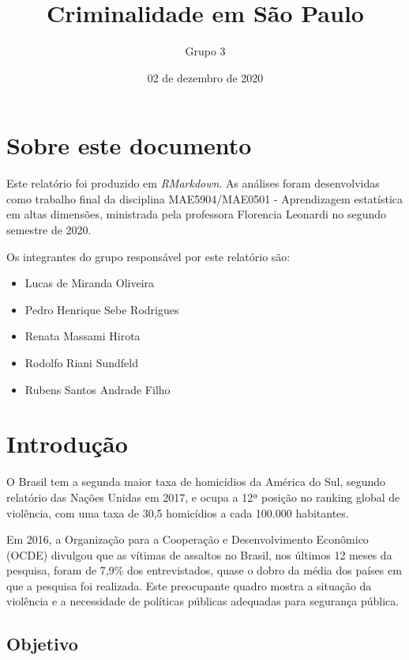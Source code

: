 \documentclass[
  12pt,
  portuguese,
]{report}
\title{Criminalidade em São Paulo}
\author{Grupo 3}
\date{02 de dezembro de 2020}
\providecommand{\tightlist}{%
  \setlength{\itemsep}{0pt}\setlength{\parskip}{0pt}}
\begin{document}
\maketitle

\listoftables
\listoffigures
\hypertarget{sobre-este-documento}{%
\chapter*{Sobre este documento}\label{sobre-este-documento}}

Este relatório foi produzido em \emph{RMarkdown}. As análises foram desenvolvidas como trabalho final da disciplina MAE5904/MAE0501 - Aprendizagem estatística em altas dimensões, ministrada pela professora Florencia Leonardi no segundo semestre de 2020.

Os integrantes do grupo responsável por este relatório são:

\begin{itemize}
\tightlist
\item
  Lucas de Miranda Oliveira
\item
  Pedro Henrique Sebe Rodrigues
\item
  Renata Massami Hirota
\item
  Rodolfo Riani Sundfeld
\item
  Rubens Santos Andrade Filho
\end{itemize}

\hypertarget{introducao}{%
\chapter{Introdução}\label{introducao}}

O Brasil tem a segunda maior taxa de homicídios da América do Sul, segundo relatório das Nações Unidas em 2017, e ocupa a 12ª posição no ranking global de violência, com uma taxa de 30,5 homicídios a cada 100.000 habitantes.

Em 2016, a Organização para a Cooperação e Desenvolvimento Econômico (OCDE) divulgou que as vítimas de assaltos no Brasil, nos últimos 12 meses da pesquisa, foram de 7,9\% dos entrevistados, quase o dobro da média dos países em que a pesquisa foi realizada. Este preocupante quadro mostra a situação da violência e a necessidade de políticas públicas adequadas para segurança pública.

\hypertarget{objetivo}{%
\section{Objetivo}\label{objetivo}}
\end{document}
